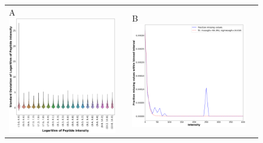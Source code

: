 \documentclass[10pt,letterpaper]{article}
\begin{document}
\begin{figure}[H]
    \centering
    \begin{tabular}{lclc} 


        A \includegraphics[width=0.41\linewidth]{../../result/report_plots/osw_sigma_mu_violinplot_qval_filtered_peptide_filtered_qbinned.png} & &%
        B \includegraphics[width=0.49\linewidth]{../../result/report_plots/osw_fraction_missing_values.png} & \\%


\end{tabular}
\end{figure}
\end{document}
